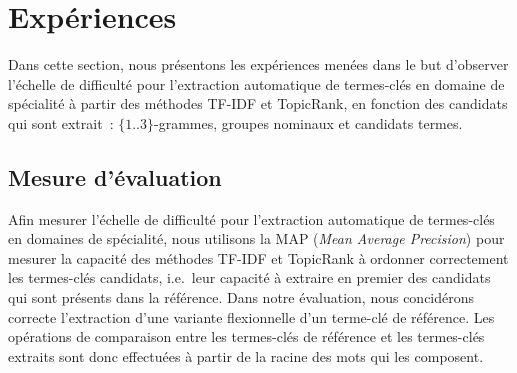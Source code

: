 \section{Expériences}
\label{sec:experiences}
  Dans cette section, nous présentons les expériences menées dans le but
  d'observer l'échelle de difficulté pour l'extraction automatique de
  termes-clés en domaine de spécialité à partir des méthodes TF-IDF et
  TopicRank, en fonction des candidats qui sont extrait~: $\{1..3\}$-grammes,
  groupes nominaux et candidats termes.

  \subsection{Mesure d'évaluation}
  \label{subsec:mesure_d_evaluation}
    Afin mesurer l'échelle de difficulté pour l'extraction automatique de
    termes-clés en domaines de spécialité, nous utilisons la MAP (\textit{Mean
    Average Precision}) pour mesurer la capacité des méthodes TF-IDF et
    TopicRank à ordonner correctement les termes-clés candidats, i.e.~leur
    capacité à extraire en premier des candidats qui sont présents dans la
    référence. Dans notre évaluation, nous concidérons correcte l'extraction
    d'une variante flexionnelle d'un terme-clé de référence. Les opérations de
    comparaison entre les termes-clés de référence et les termes-clés extraits
    sont donc effectuées à partir de la racine des mots qui les composent.

